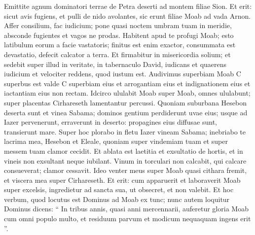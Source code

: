 \begin{biblechapter}
\begin{biblechapter}
\begin{biblechapter}
\begin{biblechapter}
\begin{biblechapter}
\begin{biblechapter}
\begin{biblechapter}
\begin{biblechapter}
\begin{biblechapter}
\begin{biblechapter}
\begin{biblechapter}
\begin{biblechapter}
\begin{biblechapter}
\begin{biblechapter}
\begin{biblechapter}
\begin{biblechapter}
\verse Emittite agnum dominatori terrae
 de Petra deserti ad montem filiae Sion.
 \verse Et erit: sicut avis fugiens,
 et pulli de nido avolantes,
 sic erunt filiae Moab
 ad vada Arnon.
 \verse Affer consilium, fac iudicium;
 pone quasi noctem umbram tuam in meridie,
 absconde fugientes et vagos ne prodas.
 \verse Habitent apud te profugi Moab;
 esto latibulum eorum a facie vastatoris;
 finitus est enim exactor,
 consummata est devastatio,
 defecit calcator a terra.
 \verse Et firmabitur in misericordia solium;
 et sedebit super illud in veritate,
 in tabernaculo David, iudicans et quaerens iudicium
 et velociter reddens, quod iustum est.
 \verse Audivimus superbiam Moab
 C superbus est valde C
 superbiam eius et arrogantiam eius et indignationem eius
 et iactantiam eius non rectam.
 \verse Idcirco ululabit Moab super Moab,
 omnes ululabunt;
 super placentas Cirhareseth
 lamentantur percussi.
 \verse Quoniam suburbana Hesebon deserta sunt et vinea Sabama;
 dominos gentium perdiderunt uvae eius;
 usque ad Iazer pervenerunt,
 erraverunt in deserto:
 propagines eius diffusae sunt,
 transierunt mare.
 \verse Super hoc plorabo in fletu Iazer vineam Sabama;
 inebriabo te lacrima mea, Hesebon et Eleale,
 quoniam super vindemiam tuam et super messem tuam
 clamor cecidit.
 \verse Et ablata est laetitia et exsultatio de hortis,
 et in vineis non exsultant neque iubilant.
 Vinum in torculari non calcabit, qui calcare consueverat;
 clamor cessavit.
 \verse Ideo venter meus super Moab quasi cithara fremit,
 et viscera mea super Cirhareseth.
 \verse Et erit: cum apparuerit
 et laboraverit Moab super excelsis,
 ingredietur ad sancta sua, ut obsecret,
 et non valebit.
 \verse Et hoc verbum, quod locutus est Dominus ad Moab ex tunc; 
\verse nunc autem loquitur Dominus dicens: “ In tribus annis, quasi anni mercennarii, auferetur gloria Moab cum omni populo multo, et residuum parvum et modicum nequaquam ingens erit ”.
 

\end{biblechapter}
\end{biblechapter}
\end{biblechapter}
\end{biblechapter}
\end{biblechapter}
\end{biblechapter}
\end{biblechapter}
\end{biblechapter}
\end{biblechapter}
\end{biblechapter}
\end{biblechapter}
\end{biblechapter}
\end{biblechapter}
\end{biblechapter}
\end{biblechapter}
\end{biblechapter}
